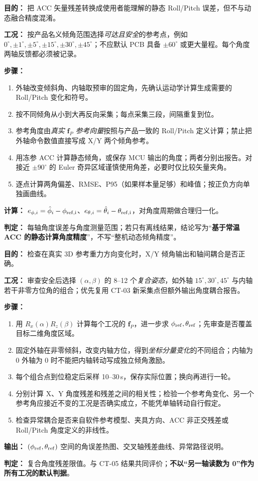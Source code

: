\textbf{目的：} 把 ACC 矢量残差转换成使用者能理解的静态 Roll/Pitch 误差，但不与动态融合精度混淆。
\par\textbf{工况：} 按产品名义倾角范围选择\emph{可达且安全}的参考点，例如 $0^\circ,\pm1^\circ,\pm5^\circ,\pm15^\circ,\pm30^\circ,\pm45^\circ$；不应默认 PCB 具备 $\pm60^\circ$ 或更大量程。每个角度两轴反馈都必须被记录。
\par\textbf{步骤：}
\begin{enumerate}
\item 外轴改变倾斜角、内轴取预审的固定角，先确认运动学计算生成需要的 Roll/Pitch 变化和符号。
\item 按不同倾角从小到大再反向采集；每点采集三段，间隔重复到位。
\item 参考角度由\emph{真实 $\bm f_P$ 参考向量}按照与产品一致的 Roll/Pitch 定义计算；禁止把外轴命令数值直接写成 X/Y 两个倾角参考。
\item 用冻参 ACC 计算静态倾角，或保存 MCU 输出的角度；两者分别出报告。对接近 $\pm90^\circ$ 的 Euler 奇异区域谨慎使用角差，必要时仅比较矢量夹角。
\item 逐点计算两角偏差、RMSE、P95（如果样本量足够）和峰值；按正负方向单独画曲线。
\end{enumerate}
\textbf{计算：} $e_{\phi,i}=\hat\phi_i-\phi_{\rm ref,i}$、$e_{\theta,i}=\hat\theta_i-\theta_{\rm ref,i}$，对角度周期做合理归一化。
\par\textbf{判定：} 每轴角度误差与角度测量范围\pending；若只有离线结果，结论写为“\textbf{基于常温 ACC 的静态计算角度精度}”，不写“整机动态倾角精度”。

\textbf{目的：} 检查在真实 3D 参考重力方向变化时，X/Y 倾角输出和轴间耦合是否正确。
\par\textbf{工况：} 审查安全后选择 $(\alpha,\beta)$ 的 8--12 个\emph{复合姿态}，如外轴 $15^\circ,30^\circ,45^\circ$ 与内轴若干非零方位角的组合；优先复用 CT-03 新采集点但额外输出角度耦合报告。
\par\textbf{步骤：}
\begin{enumerate}
\item 用 $R_x(\alpha)R_z(\beta)$ 计算每个工况的 $\bm f_{P}$，进一步求 $\phi_{\rm ref},\theta_{\rm ref}$；先审查是否覆盖目标二维角度区域。
\item 固定外轴在非零倾斜，改变内轴方位，得到\emph{坐标分量变化}的不同组合；内轴为 0 外轴为 0 时不能把内轴转动写成独立倾角激励。
\item 每个组合点到位稳定后采样 10--30\,s，保存实际位置；换向再进行一轮。
\item 分别计算 X、Y 角度残差和残差之间的相关性；检验一个参考角变化、另一个参考角应接近不变的工况是否确实成立，不能凭单轴转动自行假定。
\item 检查异常耦合是否来自软件参考模型、夹具方向、ACC 非正交残差或 Roll/Pitch 角度定义的非线性。
\end{enumerate}
\textbf{输出：} $(\phi_{\rm ref},\theta_{\rm ref})$ 空间的角误差热图、交叉轴残差曲线、异常路径说明。
\par\textbf{判定：} 复合角度残差限值\pending。与 CT-05 结果共同评价；\textbf{不以“另一轴读数为 0”作为所有工况的默认判据}。

